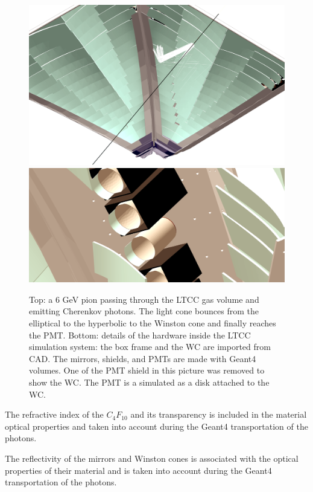 \begin{figure}
	\centering
	\includegraphics[width=0.99\columnwidth, keepaspectratio]{img/ltccGeometry.png}
	\includegraphics[width=0.99\columnwidth, keepaspectratio]{img/ltccDetail.png}
	\caption{Top: a 6 GeV pion passing through the LTCC gas volume and emitting Cherenkov photons. The light cone
            bounces from the elliptical to the hyperbolic to the Winston cone and finally reaches the PMT.
            Bottom: details of the hardware inside the LTCC simulation system: the box frame and the WC are
            imported from CAD. The mirrors, shields, and PMTs are made with Geant4 volumes. One of the PMT shield
            in this picture was removed to show the WC. The PMT is a simulated as a disk attached to the WC. }
	\label{fig:ltccGeometry}
\end{figure}

The refractive index of the $C_4F_{10}$ and its transparency is included in the material optical properties and taken
into account during the Geant4 transportation of the photons.

The reflectivity of the mirrors and Winston cones is associated with the optical properties of their material and
is taken into account during the Geant4 transportation of the photons.

